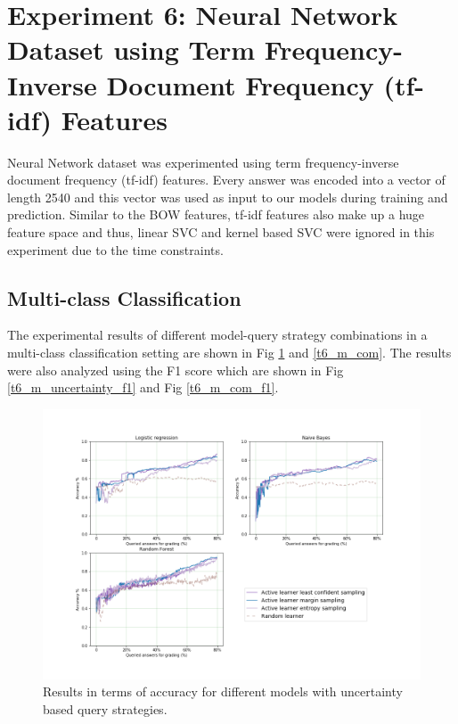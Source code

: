 	\clearpage
	\section{Experiment 6: Neural Network Dataset using Term Frequency-Inverse Document Frequency (tf-idf) Features}
	
	Neural Network dataset was experimented using term frequency-inverse document frequency (tf-idf) features.  Every answer was encoded into a vector of length 2540 and this vector was used as input to our models during training and prediction. Similar to the BOW features, tf-idf features also make up a huge feature space and thus, linear SVC and kernel based SVC were ignored in this experiment due to the time constraints.    
	
	\subsection{Multi-class Classification}
	
	The experimental results of different model-query strategy combinations in a multi-class classification setting are shown in Fig \ref{t6_m_uncertainty} and \ref{t6_m_com}. The results were also analyzed using the F1 score which are shown in Fig \ref{t6_m_uncertainty_f1} and Fig \ref{t6_m_com_f1}. 
	
	\begin{figure}[!htb]
		\centering
		\includegraphics[scale=0.45]{images/task6_accuracy_uncertainty}
		\caption{Results in terms of accuracy for different models with uncertainty based query strategies.}
		\label{t6_m_uncertainty}
	\end{figure}
	
